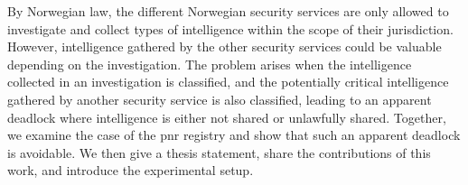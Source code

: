 By Norwegian law, the different Norwegian security services are only allowed to investigate and collect types of intelligence within the scope
of their jurisdiction. However, intelligence gathered by the other security services could be valuable depending on the investigation. The problem arises when the intelligence collected in an investigation is classified, and the potentially critical intelligence gathered by another security service is also classified, leading to an apparent deadlock where intelligence is either not shared or unlawfully shared. Together, we examine the case of the \acrfull{pnr} registry and show that such an apparent deadlock is avoidable. We then give a thesis statement, share the contributions of this work, and introduce the experimental setup.
